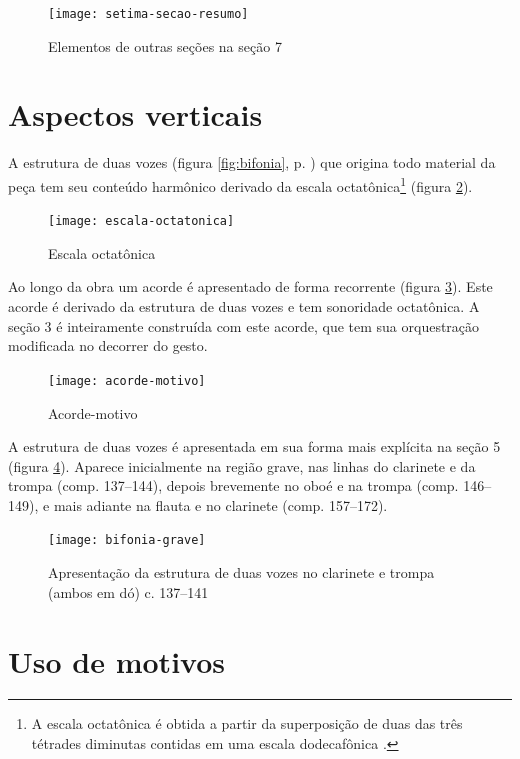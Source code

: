 \begin{figure}
  \centering
  \texttt{[image: setima-secao-resumo]}
  \caption{Elementos de outras seções na seção 7}
  \label{fig:setima-secao-resumo}
\end{figure}
\section{Aspectos verticais}
\label{sec:aspectos-verticais}

A estrutura de duas vozes (figura \ref{fig:bifonia},
p. \pageref{fig:bifonia}) que origina todo material da peça tem seu
conteúdo harmônico derivado da escala octatônica\footnote{A escala
  octatônica é obtida a partir da superposição de duas das três
  tétrades diminutas contidas em uma escala dodecafônica
  \cite[p. 76]{antokoletz90:music}.} (figura
\ref{fig:escala-octatonica}).

\begin{figure}
  \centering
  \texttt{[image: escala-octatonica]}
  \caption{Escala octatônica}
  \label{fig:escala-octatonica}
\end{figure}

Ao longo da obra um acorde é apresentado de forma recorrente (figura
\ref{fig:acorde-motivo}). Este acorde é derivado da estrutura de duas
vozes e tem sonoridade octatônica. A seção 3 é inteiramente construída
com este acorde, que tem sua orquestração modificada no decorrer do
gesto.

\begin{figure}[!t]
  \centering
  \texttt{[image: acorde-motivo]}
  \caption{Acorde-motivo}
  \label{fig:acorde-motivo}
\end{figure}

A estrutura de duas vozes é apresentada em sua forma mais explícita na
seção 5 (figura \ref{fig:bifonia-grave}). Aparece inicialmente na
região grave, nas linhas do clarinete e da trompa (comp. 137--144),
depois brevemente no oboé e na trompa (comp. 146--149), e mais adiante
na flauta e no clarinete (comp. 157--172).

\begin{figure}
  \centering
  \texttt{[image: bifonia-grave]}
  \caption{Apresentação da estrutura de duas vozes no clarinete e
    trompa (ambos em dó) c. 137--141}
  \label{fig:bifonia-grave}
\end{figure}
\section{Uso de motivos}
\label{sec:uso-de-motivos}

